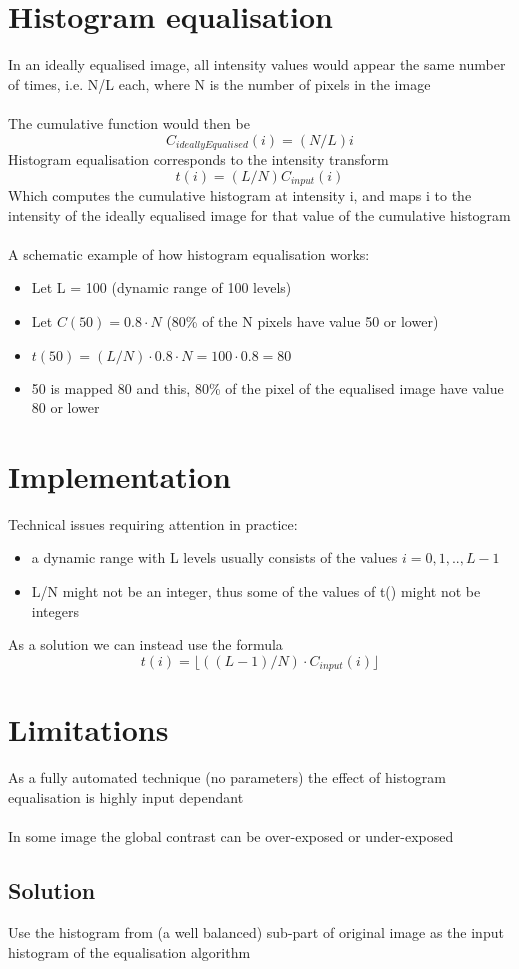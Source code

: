\documentclass{article}[18pt]
\begin{document}
\section{Histogram equalisation}
In an ideally equalised image, all intensity values would appear the same number of times, i.e. N/L each, where N is the number of pixels in the image\\
\\
The cumulative function would then be
$$C_{ideallyEqualised}(i)=(N/L)i$$
Histogram equalisation corresponds to the intensity transform
$$t(i)=(L/N)C_{input}(i)$$
Which computes the cumulative histogram at intensity i, and maps i to the intensity of the ideally equalised image for that value of the cumulative histogram\\
\\
A schematic example of how histogram equalisation works:
\begin{itemize}
	\item Let L = 100 (dynamic range of 100 levels)
	\item Let $C(50) = 0.8\cdot N$ (80\% of the N pixels have value 50 or lower)
	\item $t(50)=(L/N)\cdot 0.8\cdot N = 100 \cdot 0.8 = 80$
	\item 50 is mapped 80 and this, 80\% of the pixel of the equalised image have value 80 or lower
\end{itemize}
\section{Implementation}
Technical issues requiring attention in practice:
\begin{itemize}
	\item a dynamic range with L levels usually consists of the values $i=0,1,..,L-1$
	\item L/N might not be an integer, thus some of the values of t() might not be integers
\end{itemize}
As a solution we can instead use the formula
$$t(i)=\lfloor ((L-1)/N)\cdot C_{input}(i) \rfloor$$
\section{Limitations}
As a fully automated technique (no parameters) the effect of histogram equalisation is highly input dependant\\
\\
In some image the global contrast can be over-exposed or under-exposed
\subsection{Solution}
Use the histogram from (a well balanced) sub-part of original image as the input histogram of the equalisation algorithm
\end{document}
